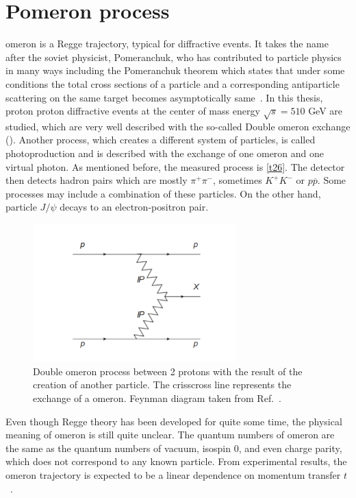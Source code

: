 \section{Pomeron process}
\label{Pomeronprocess}
\Pom omeron is a Regge trajectory, typical for diffractive events. It takes the name after the soviet physicist, Pomeranchuk, who has contributed to particle physics in many ways including the Pomeranchuk theorem which states that under some conditions the total cross sections of a particle and a corresponding antiparticle scattering on the same target becomes asymptotically same~\cite{PomeronPhysics}.
\newline
In this thesis, proton proton diffractive events at the center of mass energy $\sqrt{s} = 510$ GeV are studied, which are very well described with the so-called Double \Pom omeron exchange (\DPE). Another process, which creates a different system of particles, is called photoproduction and is described with the exchange of one \Pom omeron and one virtual photon. As mentioned before, the measured process is \autoref{t26}. The detector then detects hadron pairs which are mostly $\pi^+ \pi^-$, sometimes $K^+ K^-$ or $p \overline{p}$. Some processes may include a combination of these particles. On the other hand, particle $J/\psi$ decays to an electron-positron pair.
\FloatBarrier
\begin{figure}[ht]
    \centering
    \includegraphics[width=0.7\textwidth]{figures/pomeronprocess.jpg}
    \caption[Double \Pom omeron exchange]{Double \Pom omeron  process between 2 protons with the result of the creation of another particle. The crisscross line represents the exchange of a \Pom omeron. Feynman diagram taken from Ref.~\cite{Guryn2016}.}
    \label{tf3}
\end{figure}
\FloatBarrier
Even though Regge theory has been developed for quite some time, the physical meaning of \Pom omeron is still quite unclear. The quantum numbers of \Pom omeron are the same as the quantum numbers of vacuum, isospin 0, and even charge parity, which does not correspond to any known particle. From experimental results, the \Pom omeron trajectory is expected to be a linear dependence on momentum transfer $t$~\cite{Albrow_2010}.
